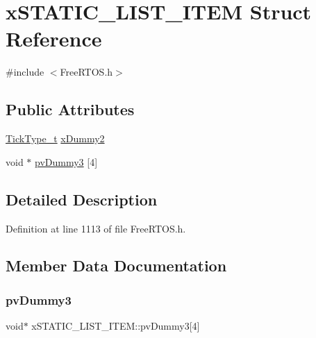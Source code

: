\hypertarget{structx_s_t_a_t_i_c___l_i_s_t___i_t_e_m}{}\section{x\+S\+T\+A\+T\+I\+C\+\_\+\+L\+I\+S\+T\+\_\+\+I\+T\+EM Struct Reference}
\label{structx_s_t_a_t_i_c___l_i_s_t___i_t_e_m}


{\ttfamily \#include $<$Free\+R\+T\+O\+S.\+h$>$}

\subsection*{Public Attributes}
\begin{DoxyCompactItemize}
\item 
\hyperlink{externals_2freertos_2portable_2_g_c_c_2_a_r_m___c_m0_2portmacro_8h_aa69c48c6e902ce54f70886e6573c92a9}{Tick\+Type\+\_\+t} \hyperlink{structx_s_t_a_t_i_c___l_i_s_t___i_t_e_m_a902f5a362987a85e76338f233e16817e}{x\+Dummy2}
\item 
void $\ast$ \hyperlink{structx_s_t_a_t_i_c___l_i_s_t___i_t_e_m_ac8df611d8ab21275ef688b0ca7ca352c}{pv\+Dummy3} \mbox{[}4\mbox{]}
\end{DoxyCompactItemize}


\subsection{Detailed Description}


Definition at line 1113 of file Free\+R\+T\+O\+S.\+h.



\subsection{Member Data Documentation}
\mbox{\label{structx_s_t_a_t_i_c___l_i_s_t___i_t_e_m_ac8df611d8ab21275ef688b0ca7ca352c}} 
\subsubsection{\texorpdfstring{pv\+Dummy3}{pvDummy3}}
{\footnotesize\ttfamily void$\ast$ x\+S\+T\+A\+T\+I\+C\+\_\+\+L\+I\+S\+T\+\_\+\+I\+T\+E\+M\+::pv\+Dummy3\mbox{[}4\mbox{]}}



